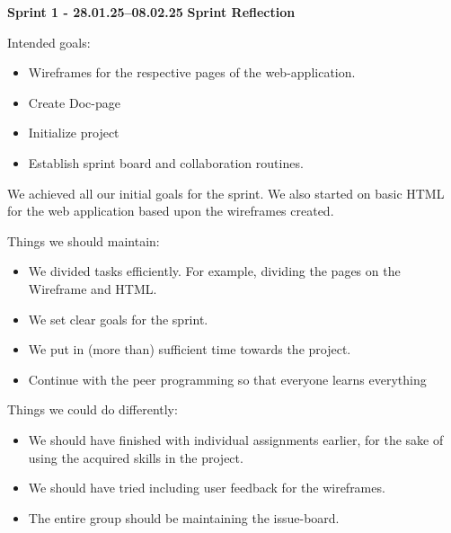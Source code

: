 \documentclass{article}
\begin{document}
\textbf{Sprint 1 - 28.01.25–08.02.25} 
\textbf{Sprint Reflection} 


Intended goals:
\begin{itemize}
    \item Wireframes for the respective pages of the web-application.
    \item Create Doc-page
    \item Initialize project
\item Establish sprint board and collaboration routines.
\end{itemize}

We achieved all our initial goals for the sprint. We also started on basic HTML for the web application based upon the wireframes created. 

Things we should maintain:
\begin{itemize}
    \item We divided tasks efficiently. For example, dividing the pages on the Wireframe and HTML.
    \item We set clear goals for the sprint.
    \item We put in (more than) sufficient time towards the project.
    \item Continue with the peer programming so that everyone learns everything
\end{itemize}

Things we could do differently:
\begin{itemize}
    \item We should have finished with individual assignments earlier, for the sake of using the acquired skills in the project.
    \item We should have tried including user feedback for the wireframes.
    \item The entire group should be maintaining the issue-board.
\end{itemize}
\end{document}
